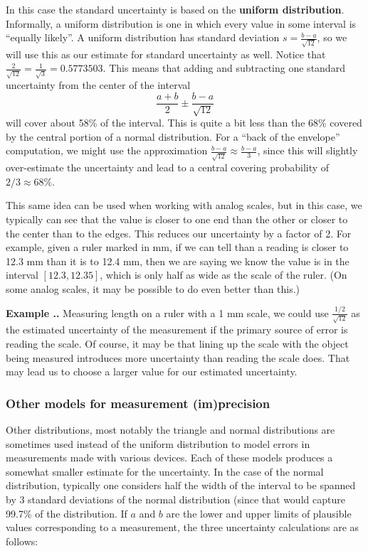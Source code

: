 \documentclass[twoside]{book}\usepackage[]{graphicx}\usepackage[]{xcolor}
\def\term#1{\textbf{#1}}
\newcounter{example}[section]
\newenvironment{example}%
{\refstepcounter{example}%
\textbf{Example \thesection.\arabic{example}. }}%
{}
\begin{document}
In this case the standard uncertainty is based on the \term{uniform distribution}.  
Informally, a uniform
distribution is one in which every value in some interval is ``equally likely''.
A uniform distribution has standard deviation $s = \frac{b-a}{\sqrt{12}}$, so we will
use this as our estimate for standard uncertainty as well.
Notice that 
$\frac{2}{\sqrt{12}} = \frac{1}{\sqrt{3}} = 0.5773503 $.
This means that adding and subtracting one standard uncertainty from the center 
of the interval
\[
\frac{a+b}{2} \pm \frac{b-a}{\sqrt{12}}
\]
will cover about 58\% of the interval.  
This is quite a bit less than the 68\% covered by the central portion of a normal 
distribution.
For a ``back of the envelope'' computation, we might use the approximation 
$\frac{b-a}{\sqrt{12}} \approx \frac{b-a}{3}$,
since this will slightly over-estimate the uncertainty and lead to a central covering
probability of $2/3 \approx 68\%$.

This same idea can be used when working with analog scales, but in this case, we typically
can see that the value is closer to one end than the other or closer to the center than
to the edges.  This reduces our uncertainty by a factor of 2.  For example, given a ruler
marked in mm, if we can tell than a reading is closer to 12.3 mm than it is to 12.4 mm, then we 
are saying we know the value is in the interval $[12.3, 12.35]$, which is only half as 
wide as the scale of the ruler.  
(On some analog scales, it may be possible to do even better than this.)

\begin{example}
Measuring length on a ruler with a 1 mm scale, we could use $\frac{1/2}{\sqrt{12}}$
as the estimated uncertainty of the measurement if the primary source of error is reading
the scale.  Of course, it may be that lining up the scale with the object being measured
introduces more uncertainty than reading the scale does.  That may lead us to choose a 
larger value for our estimated uncertainty.
\end{example}

\subsubsection{Other models for measurement (im)precision}
Other distributions, most notably the triangle and normal distributions are sometimes
used instead of the uniform distribution to model errors in measurements made
with various devices.  Each of these models produces a somewhat smaller estimate
for the uncertainty.  In the case of the normal distribution, typically one considers
half the width of the interval to be spanned by 3 standard deviations of the
normal distribution (since that would capture 99.7\% of the distribution.  If $a$ and $b$
are the lower and upper limits of plausible values corresponding to a measurement,
the three uncertainty calculations are as follows:
\end{document}
